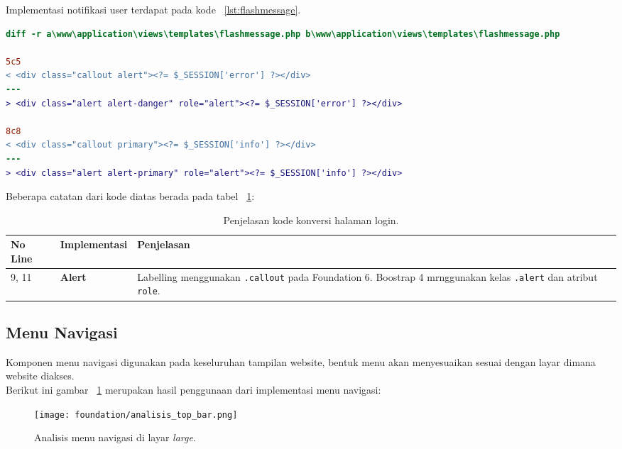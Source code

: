 Implementasi notifikasi user terdapat pada kode ~\ref{lst:flashmessage}.

\begin{lstlisting}[language=diff, caption=Perubahan file \path{\views\templates\flashmessage.php},  basicstyle=\ttfamily, frame=single,
columns=fullflexible, keepspaces=true, breaklines=true, label={lst:flashmessage}]
diff -r a\www\application\views\templates\flashmessage.php b\www\application\views\templates\flashmessage.php

5c5
< <div class="callout alert"><?= $_SESSION['error'] ?></div>
---
> <div class="alert alert-danger" role="alert"><?= $_SESSION['error'] ?></div>

8c8
< <div class="callout primary"><?= $_SESSION['info'] ?></div>
---
> <div class="alert alert-primary" role="alert"><?= $_SESSION['info'] ?></div>
\end{lstlisting}

\noindent Beberapa catatan dari kode diatas berada pada tabel ~\ref{tabelKodeLogin}:

\begin{table}[H]
	\centering
	\caption{Penjelasan kode konversi halaman login.}
	\begin{tabularx}{\textwidth}{llX}
		\toprule
		No Line & Implementasi     & Penjelasan \\
		\midrule
		9, 11 & \textbf{Alert} & Labelling menggunakan \texttt{.callout} pada Foundation 6. Boostrap 4 mrnggunakan kelas \texttt{.alert} dan atribut \texttt{role}.\\
		\bottomrule
	\end{tabularx}%
	\label{tabelKodeLogin}
\end{table}

\subsection{Menu Navigasi}
Komponen menu navigasi digunakan pada keseluruhan tampilan website, bentuk menu akan menyesuaikan sesuai dengan layar dimana website diakses. \\
Berikut ini gambar ~\ref{fig:navigasiLarge} merupakan hasil penggunaan dari implementasi menu navigasi:

\begin{figure} [H]
	\centering  
	\texttt{[image: foundation/analisis\_top\_bar.png]}  
	\caption{Analisis menu navigasi di layar \textit{large}.} 
	\label{fig:navigasiLarge}
\end{figure}

